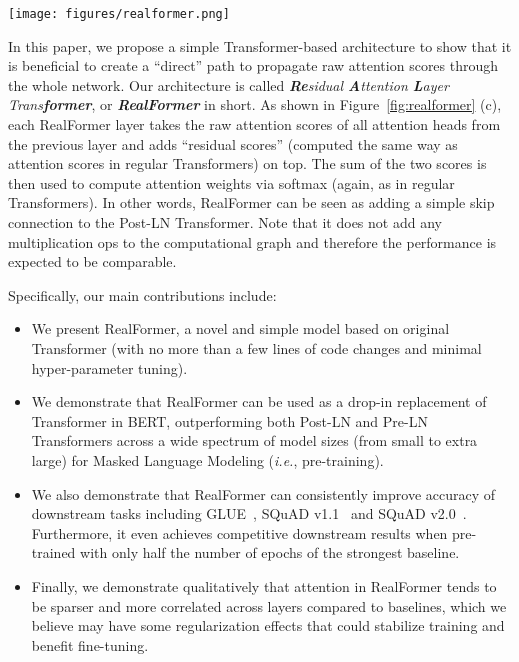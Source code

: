 \documentclass[11pt,a4paper]{article}
\begin{document}
\begin{figure*}[!h]
\centering
\texttt{[image: figures/realformer.png]}
\caption{Comparison of different Transformer layers: (a) The prevalent Post-LN layer used by (\emph{e.g.}) BERT; (b) Pre-LN layer used by (\emph{e.g.}) GPT-2 that creates a ``direct'' path to propagate token embeddings; (c) Our RealFormer layer that creates a ``direct'' path to propagate attention scores (by adding a simple skip edge on top of (a)).}
\label{fig:realformer}
\end{figure*}


In this paper, we propose a simple Transformer-based architecture to show that it is beneficial to create a ``direct'' path to propagate raw attention scores through the whole network. Our architecture is called \textit{\textbf{Re}sidual \textbf{A}ttention \textbf{L}ayer Trans\textbf{former}}, or \textit{\textbf{RealFormer}} in short. As shown in Figure~\ref{fig:realformer} (c), each RealFormer layer takes the raw attention scores of all attention heads from the previous layer and adds ``residual scores'' (computed the same way as attention scores in regular Transformers) on top. The sum of the two scores is then used to compute attention weights via softmax (again, as in regular Transformers).
In other words, RealFormer can be seen as adding a simple skip connection to the Post-LN Transformer. Note that it does not add any multiplication ops to the computational graph and therefore the performance is expected to be comparable.

Specifically, our main contributions include:
\begin{itemize}
\item We present RealFormer, a novel and simple model based on original Transformer (with no more than a few lines of code changes and minimal hyper-parameter tuning).
\item We demonstrate that RealFormer can be used as a drop-in replacement of Transformer in BERT, outperforming both Post-LN and Pre-LN Transformers across a wide spectrum of model sizes (from small to extra large) for Masked Language Modeling (\emph{i.e.}, pre-training).
\item We also demonstrate that RealFormer can consistently improve accuracy of downstream tasks including GLUE~\citep{Wang-2018-glue}, SQuAD v1.1~\citep{Rajpurkar-2016-squad} and SQuAD v2.0~\citep{Rajpurkar-2018-squad2}. Furthermore, it even achieves competitive downstream results when pre-trained with only half the number of epochs of the strongest baseline.
\item Finally, we demonstrate qualitatively that attention in RealFormer tends to be sparser and more correlated across layers compared to baselines, which we believe may have some regularization effects that could stabilize training and benefit fine-tuning.
\end{itemize}
\end{document}
